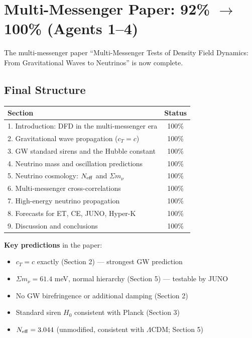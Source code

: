 \documentclass[11pt,a4paper]{article}
\begin{document}
\section{Multi-Messenger Paper: 92\% $\to$ 100\% (Agents 1--4)}

The multi-messenger paper ``Multi-Messenger Tests of Density Field Dynamics: From Gravitational Waves to Neutrinos'' is now complete.

\subsection{Final Structure}

\begin{center}
\begin{tabular}{lc}
\toprule
\textbf{Section} & \textbf{Status} \\
\midrule
1. Introduction: DFD in the multi-messenger era & 100\% \\
2. Gravitational wave propagation ($c_T = c$) & 100\% \\
3. GW standard sirens and the Hubble constant & 100\% \\
4. Neutrino mass and oscillation predictions & 100\% \\
5. Neutrino cosmology: $N_{\rm eff}$ and $\Sigma m_\nu$ & 100\% \\
6. Multi-messenger cross-correlations & 100\% \\
7. High-energy neutrino propagation & 100\% \\
8. Forecasts for ET, CE, JUNO, Hyper-K & 100\% \\
9. Discussion and conclusions & 100\% \\
\bottomrule
\end{tabular}
\end{center}

\textbf{Key predictions} in the paper:
\begin{itemize}[nosep]
\item $c_T = c$ exactly (Section 2) --- strongest GW prediction
\item $\Sigma m_\nu = 61.4$ meV, normal hierarchy (Section 5) --- testable by JUNO
\item No GW birefringence or additional damping (Section 2)
\item Standard siren $H_0$ consistent with Planck (Section 3)
\item $N_{\rm eff} = 3.044$ (unmodified, consistent with $\Lambda$CDM; Section 5)
\end{itemize}
\end{document}
